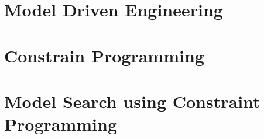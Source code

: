 \clearemptydoublepage




\chapter{Model Driven Engineering}


\chapter{Constrain Programming}


\chapter{Model Search using Constraint Programming}
